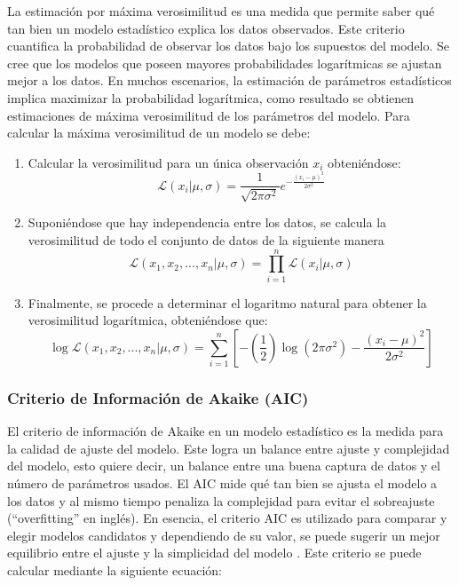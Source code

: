 La estimación por máxima verosimilitud es una medida que permite saber qué tan bien un modelo estadístico explica los datos observados. Este criterio cuantifica la probabilidad de observar los datos bajo los supuestos del modelo. Se cree que los modelos que poseen mayores probabilidades logarítmicas se ajustan mejor a los datos. En muchos escenarios, la estimación de parámetros estadísticos implica maximizar la probabilidad logarítmica, como resultado se obtienen estimaciones de máxima verosimilitud de los parámetros del modelo. Para calcular la máxima verosimilitud de un modelo se debe:
\begin{enumerate}
    \item Calcular la verosimilitud para un única observación $x_{i}$ obteniéndose:
    \begin{equation*}
        \mathcal{L}(x_{i}|\mu,\sigma) = \frac{1}{\sqrt{2\pi\sigma^{2}}} e^{-\frac{(x_{i}-\mu)^{2}}{2\sigma^{2}}}
    \end{equation*}
    \item Suponiéndose que hay independencia entre los datos, se calcula la verosimilitud de todo el conjunto de datos de la siguiente manera
    \begin{equation*}
        \mathcal{L}(x_{1},x_{2},...,x_{n}|\mu,\sigma) = \prod_{i=1}^{n}\mathcal{L}(x_{i}|\mu,\sigma)
    \end{equation*}
    \item Finalmente, se procede a determinar el logaritmo natural para obtener la verosimilitud logarítmica, obteniéndose que:
    \begin{equation}
        \log\mathcal{L}(x_{1},x_{2},...,x_{n}|\mu,\sigma) = \sum_{i=1}^{n}\left[-\left(\frac{1}{2}\right)\log(2\pi\sigma^{2})-\frac{(x_{i}-\mu)^{2}}{2\sigma^{2}}\right]
    \end{equation}
\end{enumerate}

\subsubsection{ Criterio de Información de Akaike (AIC)}\label{aiclabel}

El criterio de información de Akaike en un modelo estadístico es la medida para la calidad de ajuste del modelo. Este logra un balance entre ajuste y complejidad del modelo, esto quiere decir, un balance entre una buena captura de datos y el número de parámetros usados. El AIC mide qué tan bien se ajusta el modelo a los datos y al mismo tiempo penaliza la complejidad para evitar el sobreajuste (``overfitting'' en inglés). En esencia, el criterio AIC es utilizado para comparar y elegir modelos candidatos y dependiendo de su valor, se puede sugerir un mejor equilibrio entre el ajuste y la simplicidad del modelo \cite{aicbicdata}. Este criterio se puede calcular mediante la siguiente ecuación:

